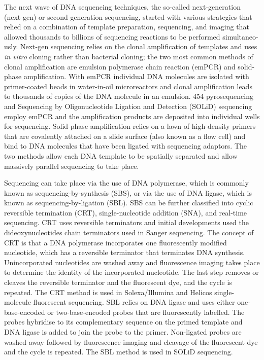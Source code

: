 The next wave of DNA sequencing techniques, the so-called next-generation (next-gen) or second generation sequencing, started with various strategies that relied on a combination of template preparation, sequencing, and imaging that allowed thousands to billions of sequencing reactions to be performed simultaneo-usly\cite{pmid19997069}. Next-gen sequencing relies on the clonal amplification of templates and uses \textit{in vitro} cloning rather than bacterial cloning; the two most common methods of clonal amplification are emulsion polymerase chain reaction (emPCR)\cite{pmid12857956} and solid-phase amplification\cite{pmid16473845}. With emPCR individual DNA molecules are isolated with primer-coated beads in water-in-oil microreactors and clonal amplification leads to thousands of copies of the DNA molecule in an emulsion. 454 pyrosequencing and Sequencing by Oligonucleotide Ligation and Detection (SOLiD) sequencing employ emPCR and the amplification products are deposited into individual wells for sequencing. Solid-phase amplification relies on a lawn of high-density primers that are covalently attached on a slide surface (also known as a flow cell) and bind to DNA molecules that have been ligated with sequencing adaptors. The two methods allow each DNA template to be spatially separated and allow massively parallel sequencing to take place.

Sequencing can take place via the use of DNA polymerase, which is commonly known as sequencing-by-synthesis (SBS), or via the use of DNA ligase, which is known as sequencing-by-ligation (SBL). SBS can be further classified into cyclic reversible termination (CRT), single-nucleotide addition (SNA), and real-time sequencing\cite{pmid19997069}. CRT uses reversible terminators and initial developments used the dideoxynucleotides chain terminators used in Sanger sequencing. The concept of CRT is that a DNA polymerase incorporates one fluorescently modified nucleotide, which has a reversible terminator that terminates DNA synthesis. Unincorporated nucleotides are washed away and fluorescence imaging takes place to determine the identity of the incorporated nucleotide. The last step removes or cleaves the reversible terminator and the fluorescent dye, and the cycle is repeated. The CRT method is used in Solexa/Illumina and Helicos single-molecule fluorescent sequencing. SBL relies on DNA ligase and uses either one-base-encoded or two-base-encoded probes that are fluorescently labelled. The probes hybridise to its complementary sequence on the primed template and DNA ligase is added to join the probe to the primer. Non-ligated probes are washed away followed by fluorescence imaging and cleavage of the fluorescent dye and the cycle is repeated. The SBL method is used in SOLiD sequencing.


